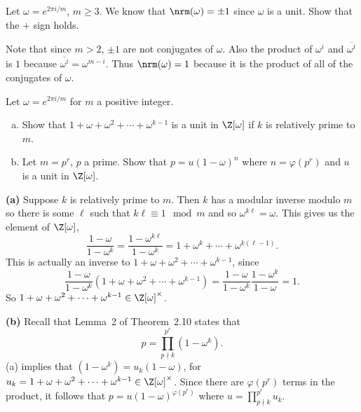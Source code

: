 \documentclass[11pt,letterpaper]{article}
\begin{document}
\begin{cproblem}{2.33}
    Let $\omega=e^{2\pi i /m}$, $m\geq 3$. We know that $\nrm(\omega)=\pm 1$ since $\omega$ is a unit. Show that the $+$ sign holds. 
\end{cproblem}

\begin{solution}
    Note that since $m>2$, $\pm 1$ are not conjugates of $\omega$. Also the product of $\omega^i$ and $\overline{\omega^i}$ is $1$ because $\overline{\omega^i}=\omega^{m-i}$. Thus $\nrm(\omega)=1$ because it is the product of all of the conjugates of $\omega$.   
\end{solution}

\begin{cproblem}{2.34}
    Let $\omega=e^{2\pi i /m}$ for $m$ a positive integer.
    \begin{enumerate}[(a)]
        \item Show that $1+\omega+\omega^2+\cdots+\omega^{k-1}$ is a unit in $\Z[\omega]$ if $k$ is relatively prime to $m$. 
        \item Let $m=p^r$, $p$ a prime. Show that $p=u(1-\omega)^n$ where $n=\varphi(p^r)$ and $u$ is a unit in $\Z[\omega]$.  
    \end{enumerate} 
\end{cproblem}

\begin{solution}
    \textbf{(a)} Suppose $k$ is relatively prime to $m$. Then $k$ has a modular inverse modulo $m$ so there is some $\ell$ such that $k\ell \equiv 1\mod m$ and so $\omega^{k\ell}=\omega$. This gives us the element of $\Z[\omega]$,
    \[
        \frac{1-\omega}{1-\omega^k}=\frac{1-\omega^{k\ell}}{1-\omega^k}=1+\omega^k+\cdots+\omega^{k(\ell-1)}
    .\]
    This is actually an inverse to $1+\omega+\omega^2+\cdots+\omega^{k-1}$, since 
    \[
        \frac{1-\omega}{1-\omega^k}(1+\omega+\omega^2+\cdots+\omega^{k-1})=\frac{1-\omega}{1-\omega^k}\frac{1-\omega^k}{1-\omega}=1
    .\]  
    So $1+\omega+\omega^2+\cdots+\omega^{k-1}\in \Z[\omega]^\times$.
    
    \textbf{(b)} Recall that Lemma~2 of Theorem~2.10 states that
    \[
        p=\prod_{p\nmid k}^{p^r}(1-\omega^k)
    .\] 
    (a) implies that $(1-\omega^k)=u_k(1-\omega)$, for $u_k=1+\omega+\omega^2+\cdots+\omega^{k-1}\in \Z[\omega]^\times$. Since there are $\varphi(p^r)$ terms in the product, it follows that $p=u(1-\omega)^{\varphi(p^r)}$ where $u=\prod^{p^r}_{p\nmid k}u_k$.    
\end{solution}
\end{document}

